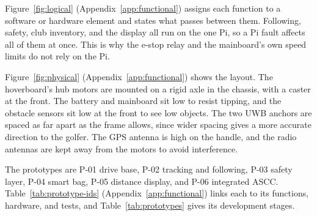 \label{sec:func-logical}

Figure~\ref{fig:logical} (Appendix~\ref{app:functional}) assigns each function to a software or hardware element and states what passes between them. Following, safety, club inventory, and the display all run on the one Pi, so a Pi fault affects all of them at once. This is why the e-stop relay and the mainboard's own speed limits do not rely on the Pi.

\label{sec:func-physical}

Figure~\ref{fig:physical} (Appendix~\ref{app:functional}) shows the layout. The hoverboard's hub motors are mounted on a rigid axle in the chassis, with a caster at the front. The battery and mainboard sit low to resist tipping, and the obstacle sensors sit low at the front to see low objects. The two \ac{UWB} anchors are spaced as far apart as the frame allows, since wider spacing gives a more accurate direction to the golfer. The \ac{GPS} antenna is high on the handle, and the radio antennas are kept away from the motors to avoid interference.

\label{sec:func-prototypes}

The prototypes are P-01 drive base, P-02 tracking and following, P-03 safety layer, P-04 smart bag, P-05 distance display, and P-06 integrated \ac{ASCC}. Table~\ref{tab:prototype-ids} (Appendix~\ref{app:functional}) links each to its functions, hardware, and tests, and Table~\ref{tab:prototypes} gives its development stages.
